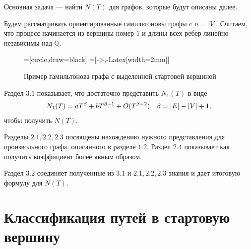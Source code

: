 \documentclass{article}
\newcommand{\squad}{
    \hspace{0.5em}
}
\begin{document}
Основная задача --- найти $N(T)$ для графов, которые будут описаны далее.

Будем рассматривать ориентированные гамильтоновы графы c $n = |V|$.
Считаем, что процесс начинается из вершины номер $1$ и длины всех ребер линейно независимы над $\mathbb{Q}$. 

\begin{figure}[!htb]
\begin{center}
=[circle,draw=black]
=[->,-{Latex[width=2mm]}]
\caption{Пример гамильтонова графа с выделенной стартовой вершиной}
\label{fig:graph}  
\end{center}
\end{figure}

Раздел $3.1$ показывает, что достаточно представить $N_{1}(T)$ в виде
\begin{gather*}
N_{1}(T) = aT^{\beta} + bT^{\beta - 1} + O(T^{\beta - 2}), \squad \beta = |E| - |V| + 1,    
\end{gather*} 
чтобы получить $N(T)$.

Разделы $2.1, 2.2, 2.3$ посвящены нахождению нужного представления для произвольного графа, описанного в разделе $1.2$. Раздел $2.4$ показывает как получить коэффициент более явным образом.

Раздел $3.2$ соединяет полученные из $3.1$ и $2.1, 2.2, 2.3$ знания и дает итоговую формулу для $N(T)$.





\section{Классификация путей в стартовую вершину}
\end{document}
